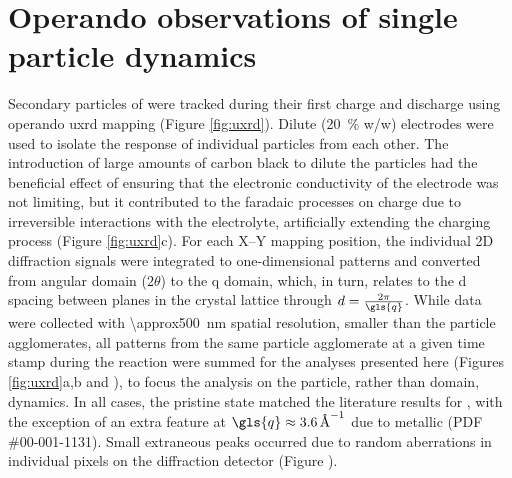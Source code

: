 \documentclass{article}
\begin{document}
\section{Operando observations of single particle dynamics}


Secondary particles of \nca{} were tracked during their first charge
and discharge using operando \gls{uxrd} mapping (Figure
\ref{fig:uxrd}). Dilute (\SI{20}{\percent} w/w) \nca{} electrodes were
used to isolate the response of individual particles from each
other. The introduction of large amounts of carbon black to dilute the
particles had the beneficial effect of ensuring that the electronic
conductivity of the electrode was not limiting, but it contributed to
the faradaic processes on charge due to irreversible interactions with
the electrolyte\cite{kostecki2014}, artificially extending the
charging process (Figure \ref{fig:uxrd}c). For each X--Y mapping
position, the individual 2D diffraction signals were integrated to
one-dimensional patterns and converted from angular domain ($2\theta$)
to the \gls{q} domain, which, in turn, relates to the d spacing
between planes in the crystal lattice through
$d=\frac{2\pi}{\gls{q}}$. While data were collected with
\SI{\approx500}{\nano\meter} spatial resolution, smaller than the
particle agglomerates, all patterns from the same particle agglomerate
at a given time stamp during the reaction were summed for the analyses
presented here (Figures \ref{fig:uxrd}a,b and
), to focus the analysis on the particle,
rather than domain, dynamics. In all cases, the pristine state matched
the literature results for \nca{} \cite{novak2015}, with the exception
of an extra feature at $\gls{q}\approx\SI{3.6}{\per\angstrom}$ due to
metallic  (PDF \#00-001-1131). Small extraneous peaks occurred
due to random aberrations in individual pixels on the diffraction
detector (Figure ).
\end{document}
